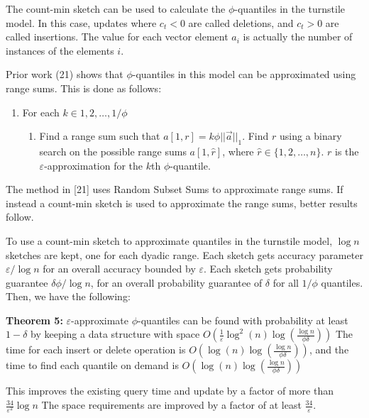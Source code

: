 \documentclass[11pt]{article}
\begin{document}
{The count-min sketch can be used to calculate the $\phi$-quantiles in the turnstile model.
In this case, updates where $c_t < 0$ are called deletions, and $c_t > 0$ are called insertions.
The value for each vector element $a_i$ is actually the number of instances of the elements
$i$.

Prior work (21) shows that $\phi$-quantiles in this model can be approximated using range sums. This is done
as follows:
\begin{enumerate}
    \item For each $k \in {1, 2, \dots, 1/\phi}$
    \begin{enumerate}
        \item Find a range sum such that $a[1, r] = k\phi||\vec{a}||_1$. Find $r$ using a binary
        search on the possible range sums $a[1, \hat{r}]$, where $\hat{r} \in \{1, 2, \dots, n\}$.  $r$ is the
        $\varepsilon$-approximation for the $k$th $\phi$-quantile.
    \end{enumerate}
\end{enumerate}
The method in [21] uses Random Subset Sums to approximate range sums.  If instead a count-min
sketch is used to approximate the range sums, better results follow.  

To use a count-min sketch to approximate quantiles in the turnstile model, $\log n$ sketches are kept,
one for each dyadic range. Each sketch gets accuracy parameter $\varepsilon/\log n$ for an overall accuracy
bounded by $\varepsilon$. Each sketch gets probability guarantee $\delta\phi/\log n$, for
an overall probability guarantee of $\delta$ for all $1/\phi$ quantiles. Then, we have the following:

\textbf{Theorem 5:} $\varepsilon$-approximate $\phi$-quantiles can be found with probability at least
$1 - \delta$ by keeping a data structure with space $O\left(\frac{1}{\varepsilon}
\log^2(n) \log \left(\frac{\log n}{\phi \delta}\right)\right)$ The time for each insert or delete operation is
$O\left(\log(n) \log \left(\frac{\log n}{\phi \delta}\right)\right)$, and the time to find each quantile on demand 
is $O\left(\log(n)\log\left(\frac{\log n}{\phi \delta}\right)\right)$

This improves the existing query time and update by a factor of more than $\frac{34}{\varepsilon^2} \log n$
The space requirements are improved by a factor of at least $\frac{34}{\varepsilon}$. 

}
\end{document}

